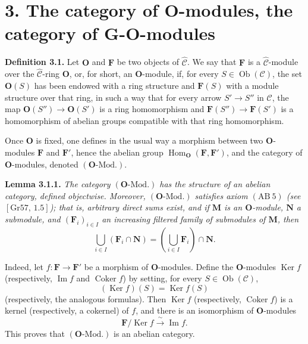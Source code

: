 
\section*{3. The category of \(\mathbf O\)-modules, the category of
\(\mathbf G\)-\(\mathbf O\)-modules}

\medskip
\noindent\textbf{Definition 3.1.}
Let \(\mathbf O\) and \(\mathbf F\) be two objects of
\(\widehat{\mathscr C}\). We say that \(\mathbf F\) is a
\(\widehat{\mathscr C}\)-module over the
\(\widehat{\mathscr C}\)-ring \(\mathbf O\), or, for short, an
\(\mathbf O\)-module, if, for every
\(S\in\operatorname{Ob}(\mathscr C)\), the set \(\mathbf O(S)\) has been
endowed with a ring structure and \(\mathbf F(S)\) with a module structure
over that ring, in such a way that for every arrow
\(S'\to S''\) in \(\mathscr C\), the map
\(\mathbf O(S'')\to\mathbf O(S')\) is a ring homomorphism and
\(\mathbf F(S'')\to\mathbf F(S')\) is a homomorphism of abelian groups
compatible with that ring homomorphism.

Once \(\mathbf O\) is fixed, one defines in the usual way a morphism between
two \(\mathbf O\)-modules \(\mathbf F\) and \(\mathbf F'\), hence the
abelian group
\(\operatorname{Hom}_{\mathbf O}(\mathbf F,\mathbf F')\), and the category
of \(\mathbf O\)-modules, denoted \((\mathbf O\text{-Mod.})\).

\medskip
\noindent\textbf{Lemma 3.1.1.}\footnotemark
\textit{The category \((\mathbf O\text{-Mod.})\) has the structure of an
abelian category, defined objectwise. Moreover,
\((\mathbf O\text{-Mod.})\) satisfies axiom \(\mathrm{(AB\ 5)}\)
(see \([\mathrm{Gr}57,\,1.5]\)); that is, arbitrary direct sums exist, and
if \(\mathbf M\) is an \(\mathbf O\)-module, \(\mathbf N\) a submodule,
and \((\mathbf F_i)_{i\in I}\) an increasing filtered family of submodules
of \(\mathbf M\), then
\[
  \bigcup_{i\in I}(\mathbf F_i\cap\mathbf N)
    =\left(\bigcup_{i\in I}\mathbf F_i\right)\cap\mathbf N.
\]}

Indeed, let \(f:\mathbf F\to\mathbf F'\) be a morphism of
\(\mathbf O\)-modules. Define the \(\mathbf O\)-modules
\(\operatorname{Ker}f\) (respectively,
\(\operatorname{Im}f\) and \(\operatorname{Coker}f\)) by setting, for every
\(S\in\operatorname{Ob}(\mathscr C)\),
\[
  (\operatorname{Ker}f)(S)=\operatorname{Ker}f(S)
\]
(respectively, the analogous formulas). Then \(\operatorname{Ker}f\)
(respectively, \(\operatorname{Coker}f\)) is a kernel (respectively, a
cokernel) of \(f\), and there is an isomorphism of \(\mathbf O\)-modules
\[
  \mathbf F/\operatorname{Ker}f
    \xrightarrow{\ \sim\ }\operatorname{Im}f.
\]
This proves that \((\mathbf O\text{-Mod.})\) is an abelian category.

